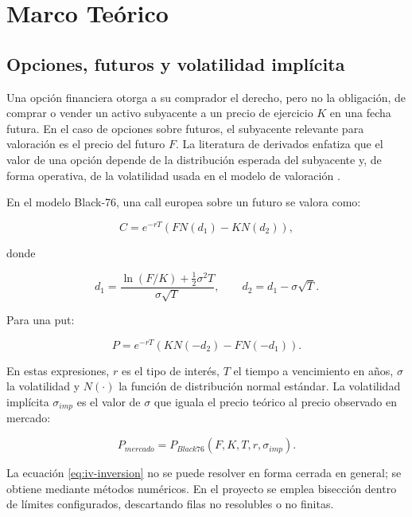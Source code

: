 
\chapter{Marco Teórico}
\label{chap:marco}

\section{Opciones, futuros y volatilidad implícita}
\label{sec:opciones-vol}

Una opción financiera otorga a su comprador el derecho, pero no la obligación, de comprar o vender un activo subyacente a un precio de ejercicio \(K\) en una fecha futura. En el caso de opciones sobre futuros, el subyacente relevante para valoración es el precio del futuro \(F\). La literatura de derivados enfatiza que el valor de una opción depende de la distribución esperada del subyacente y, de forma operativa, de la volatilidad usada en el modelo de valoración \citep{hull2022options}.

En el modelo Black-76, una call europea sobre un futuro se valora como:

\begin{equation}
C = e^{-rT}\left(FN(d_1)-KN(d_2)\right),
\label{eq:black76-call}
\end{equation}

donde

\begin{equation}
d_1 = \frac{\ln(F/K)+\frac{1}{2}\sigma^2T}{\sigma\sqrt{T}},
\qquad
d_2 = d_1-\sigma\sqrt{T}.
\label{eq:black76-d}
\end{equation}

Para una put:

\begin{equation}
P = e^{-rT}\left(KN(-d_2)-FN(-d_1)\right).
\label{eq:black76-put}
\end{equation}

En estas expresiones, \(r\) es el tipo de interés, \(T\) el tiempo a vencimiento en años, \(\sigma\) la volatilidad y \(N(\cdot)\) la función de distribución normal estándar. La volatilidad implícita \(\sigma_{imp}\) es el valor de \(\sigma\) que iguala el precio teórico al precio observado en mercado:

\begin{equation}
P_{mercado}=P_{Black76}(F,K,T,r,\sigma_{imp}).
\label{eq:iv-inversion}
\end{equation}

La ecuación \eqref{eq:iv-inversion} no se puede resolver en forma cerrada en general; se obtiene mediante métodos numéricos. En el proyecto se emplea bisección dentro de límites configurados, descartando filas no resolubles o no finitas.

